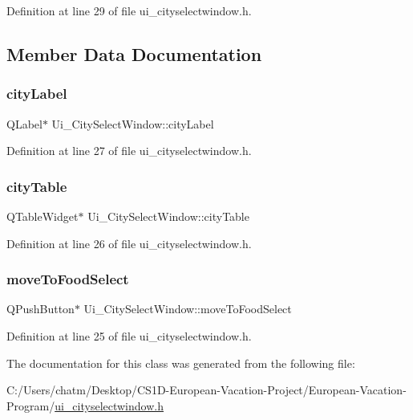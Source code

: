Definition at line 29 of file ui\+\_\+cityselectwindow.\+h.



\subsection{Member Data Documentation}
\mbox{\label{class_ui___city_select_window_af78028903db7e6b82f9d2fb50d3182d7}} 
\subsubsection{\texorpdfstring{cityLabel}{cityLabel}}
{\footnotesize\ttfamily Q\+Label$\ast$ Ui\+\_\+\+City\+Select\+Window\+::city\+Label}



Definition at line 27 of file ui\+\_\+cityselectwindow.\+h.

\mbox{\label{class_ui___city_select_window_a1973807be1feaaff2a82baafd22fbc14}} 
\subsubsection{\texorpdfstring{cityTable}{cityTable}}
{\footnotesize\ttfamily Q\+Table\+Widget$\ast$ Ui\+\_\+\+City\+Select\+Window\+::city\+Table}



Definition at line 26 of file ui\+\_\+cityselectwindow.\+h.

\mbox{\label{class_ui___city_select_window_a4ea2d95b45c0265a1f00dd4f3c85dd9c}} 
\subsubsection{\texorpdfstring{moveToFoodSelect}{moveToFoodSelect}}
{\footnotesize\ttfamily Q\+Push\+Button$\ast$ Ui\+\_\+\+City\+Select\+Window\+::move\+To\+Food\+Select}



Definition at line 25 of file ui\+\_\+cityselectwindow.\+h.



The documentation for this class was generated from the following file\+:\begin{DoxyCompactItemize}
\item 
C\+:/\+Users/chatm/\+Desktop/\+C\+S1\+D-\/\+European-\/\+Vacation-\/\+Project/\+European-\/\+Vacation-\/\+Program/\mbox{\hyperlink{ui__cityselectwindow_8h}{ui\+\_\+cityselectwindow.\+h}}\end{DoxyCompactItemize}
